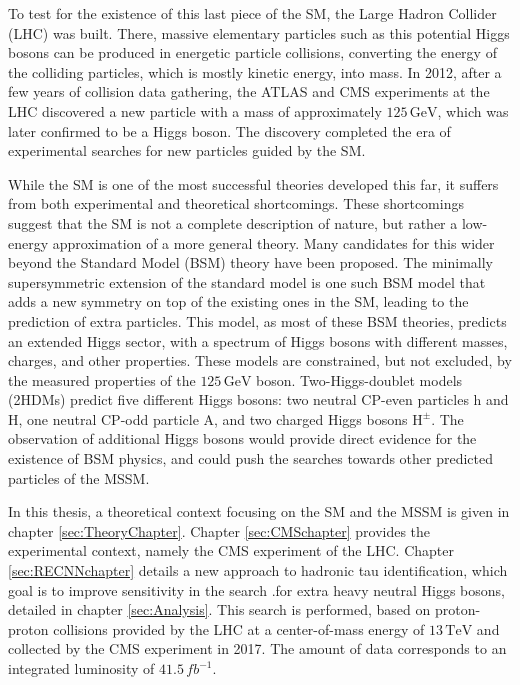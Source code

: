 To test for the existence of this last piece of the SM, the Large Hadron Collider (LHC) was built. There, massive elementary particles such as this potential Higgs bosons can be produced in energetic particle collisions, converting the energy of the colliding particles, which is mostly kinetic energy, into mass. In 2012, after a few years of collision data gathering, the ATLAS and CMS experiments at the LHC discovered a new particle with a mass of approximately $125\,\mathrm{GeV}$, which was later confirmed to be a Higgs boson. The discovery completed the era of experimental searches for new particles guided by the SM.

While the SM is one of the most successful theories developed this far, it suffers from
both experimental and theoretical shortcomings. These shortcomings suggest that the SM is not a complete description of nature, but rather a low-energy approximation of a more general theory. Many candidates for this wider beyond the Standard Model (BSM) theory have been proposed. The minimally supersymmetric extension of the standard model is one such BSM model that adds a new symmetry on top of the existing ones in the SM, leading to the prediction of extra particles. This model, as most of these BSM theories, predicts an extended Higgs sector, with a spectrum of Higgs bosons with different masses, charges, and other properties.  These models are constrained, but not excluded, by the measured properties of the $125\,\mathrm{GeV}$ boson. Two-Higgs-doublet models (2HDMs) predict five different Higgs bosons: two neutral CP-even particles h and H, one neutral CP-odd particle A, and two charged Higgs bosons $\mathrm{H^{\pm}}$. The observation of additional Higgs bosons would provide direct evidence for the existence of BSM physics, and could push the searches towards other predicted particles of the MSSM.

In this thesis, a theoretical context focusing on the SM and the MSSM is given in chapter \ref{sec:TheoryChapter}. Chapter \ref{sec:CMSchapter} provides the experimental context, namely the CMS experiment of the LHC. Chapter \ref{sec:RECNNchapter} details a new approach to hadronic tau identification, which goal is to improve sensitivity in the search .for extra heavy neutral Higgs bosons, detailed in chapter \ref{sec:Analysis}. This search is performed, based on proton-proton collisions  provided  by  the  LHC  at  a  center-of-mass  energy  of $13\,\mathrm{TeV}$ and collected by the CMS experiment in 2017.  The amount of data corresponds to an integrated luminosity of $41.5\,fb^{-1}$.




